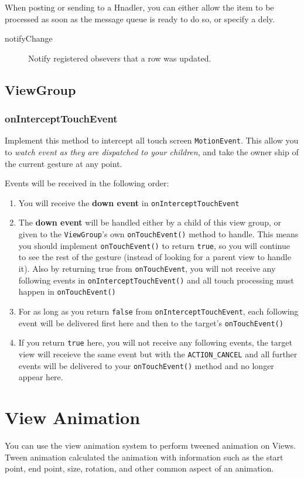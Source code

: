 \documentclass[11pt, a4paper]{book}
\begin{document}
When posting or sending to a Hnadler, you can either allow the item to be
processed as soon as the message queue is ready to do so, or specify a dely. 
\begin{description}
\item[notifyChange] Notify registered obsevers that a row was updated. 
\end{description}
\section{ViewGroup}
\subsection{onInterceptTouchEvent}
Implement this method to intercept all touch screen \verb|MotionEvent|. This
allow you to \emph{watch event as they are dispatched to your children}, and
take the owner ship of the current gesture at any point.

Events will be received in the following order:
\begin{enumerate}
\item You will receive the \textbf{down event} in \verb|onInterceptTouchEvent|
\item The \textbf{down event} will be handled either by a child of this view
group, or given to the \verb|ViewGroup|'s own \verb|onTouchEvent()| method to
handle. This means you should implement \verb|onTouchEvent()| to return
\verb|true|, so you will continue to see the rest of the gesture (instead of
looking for a parent view to handle it). Also by returning true from
\verb|onTouchEvent|, you will not receive any following events in
\verb|onInterceptTouchEvent()| and all touch processing must happen in
\verb|onTouchEvent()|
\item For as long as you return \verb|false| from \verb|onInterceptTouchEvent|,
each following event will be delivered first here and then to the target's
\verb|onTouchEvent()|
\item If you return \verb|true| here, you will not receive any following events,
the target view will receieve the same event but with the \verb|ACTION_CANCEL|
and all further events will be delivered to your \verb|onTouchEvent()| method
and no longer appear here.
\end{enumerate}

\chapter{View Animation}
You can use the view animation system to perform tweened animation on Views.
Tween animation calculated the animation with information such as the start
point, end point, size, rotation, and other common aspect of an animation.
\end{document}
